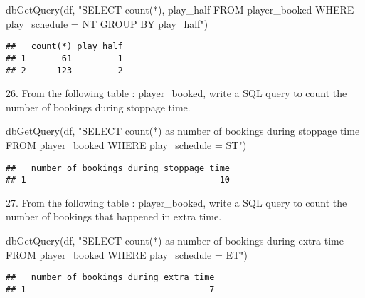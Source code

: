 \documentclass[
]{article}
\newenvironment{Shaded}{\begin{snugshade}}{\end{snugshade}}
\newcommand{\FunctionTok}[1]{\textcolor[rgb]{0.00,0.00,0.00}{#1}}
\newcommand{\NormalTok}[1]{#1}
\newcommand{\StringTok}[1]{\textcolor[rgb]{0.31,0.60,0.02}{#1}}
\begin{document}
\begin{Shaded}
\begin{Highlighting}[]
\FunctionTok{dbGetQuery}\NormalTok{(df, }\StringTok{"SELECT count(*), play\_half}
\StringTok{                FROM player\_booked}
\StringTok{                WHERE play\_schedule = \textquotesingle{}NT\textquotesingle{}}
\StringTok{                GROUP BY play\_half"}\NormalTok{)}
\end{Highlighting}
\end{Shaded}

\begin{verbatim}
##   count(*) play_half
## 1       61         1
## 2      123         2
\end{verbatim}

26. From the following table : player\_booked, write a SQL query to
count the number of bookings during stoppage time.

\begin{Shaded}
\begin{Highlighting}[]
\FunctionTok{dbGetQuery}\NormalTok{(df, }\StringTok{"SELECT count(*) as \textquotesingle{}number of bookings during stoppage time\textquotesingle{}}
\StringTok{                FROM player\_booked}
\StringTok{                WHERE play\_schedule = \textquotesingle{}ST\textquotesingle{}"}\NormalTok{)}
\end{Highlighting}
\end{Shaded}

\begin{verbatim}
##   number of bookings during stoppage time
## 1                                      10
\end{verbatim}

27. From the following table : player\_booked, write a SQL query to
count the number of bookings that happened in extra time.

\begin{Shaded}
\begin{Highlighting}[]
\FunctionTok{dbGetQuery}\NormalTok{(df, }\StringTok{"SELECT count(*) as \textquotesingle{}number of bookings during extra time\textquotesingle{}}
\StringTok{                FROM player\_booked}
\StringTok{                WHERE play\_schedule = \textquotesingle{}ET\textquotesingle{}"}\NormalTok{)}
\end{Highlighting}
\end{Shaded}

\begin{verbatim}
##   number of bookings during extra time
## 1                                    7
\end{verbatim}
\end{document}
